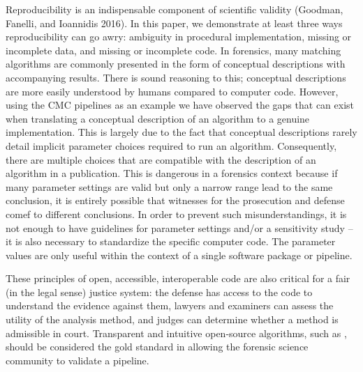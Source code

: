 Reproducibility is an indispensable component of scientific validity (Goodman, Fanelli, and Ioannidis 2016).
In this paper, we demonstrate at least three ways reproducibility can go awry: ambiguity in procedural implementation, missing or incomplete data, and missing or incomplete code.
In forensics, many matching algorithms are commonly presented in the form of conceptual descriptions with accompanying results.
There is sound reasoning to this; conceptual descriptions are more easily understood by humans compared to computer code.
However, using the CMC pipelines as an example we have observed the gaps that can exist when translating a conceptual description of an algorithm to a genuine implementation.
This is largely due to the fact that conceptual descriptions rarely detail implicit parameter choices required to run an algorithm.
Consequently, there are multiple choices that are compatible with the description of an algorithm in a publication.
This is dangerous in a forensics context because if many parameter settings are valid but only a narrow range lead to the same conclusion, it is entirely possible that witnesses for the prosecution and defense comef to different conclusions.
In order to prevent such misunderstandings, it is not enough to have guidelines for parameter settings and/or a sensitivity study -- it is also necessary to standardize the specific computer code.
The parameter values are only useful within the context of a single software package or pipeline.

These principles of open, accessible, interoperable code are also critical for a fair (in the legal sense) justice system: the defense has access to the code to understand the evidence against them, lawyers and examiners can assess the utility of the analysis method, and judges can determine whether a method is admissible in court.
Transparent and intuitive open-source algorithms, such as , should be considered the gold standard in allowing the forensic science community to validate a pipeline.

